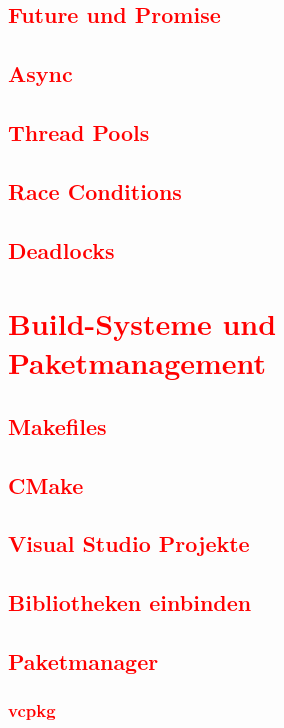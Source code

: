\section{\textcolor{red}{Future und Promise}}\label{sec:future-promise}
\section{\textcolor{red}{Async}}\label{sec:async}
\section{\textcolor{red}{Thread Pools}}\label{sec:thread-pools}
\section{\textcolor{red}{Race Conditions}}\label{sec:race-conditions}
\section{\textcolor{red}{Deadlocks}}\label{sec:deadlocks}

\cleardoublepage\chapter{\textcolor{red}{Build-Systeme und Paketmanagement}}\label{chap:build-systems}
\section{\textcolor{red}{Makefiles}}\label{sec:makefiles}
\section{\textcolor{red}{CMake}}\label{sec:cmake}
\section{\textcolor{red}{Visual Studio Projekte}}\label{sec:vs-projects}
\section{\textcolor{red}{Bibliotheken einbinden}}\label{sec:including-libraries}
\section{\textcolor{red}{Paketmanager}}\label{sec:package-managers}
\subsection{\textcolor{red}{vcpkg}}\label{sec:vcpkg}

